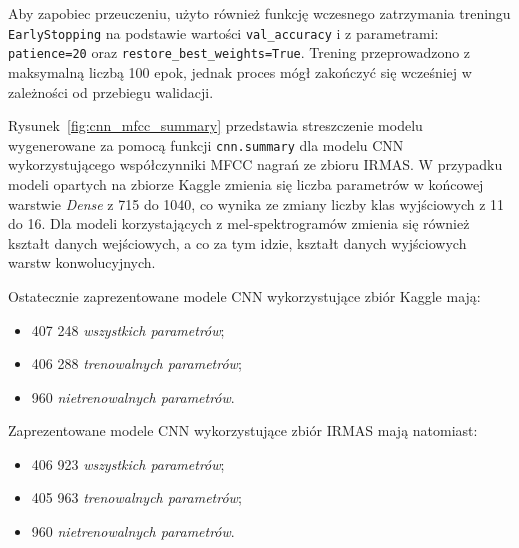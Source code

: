 \documentclass{SGGW-thesis}
\begin{document}
Aby zapobiec przeuczeniu, użyto również funkcję wczesnego zatrzymania treningu \texttt{EarlyStopping} na podstawie wartości \texttt{val\_accuracy} i z parametrami: \texttt{patience=20} oraz \texttt{restore\_best\_weights=True}. Trening przeprowadzono z maksymalną liczbą 100 epok, jednak proces mógł zakończyć się wcześniej w zależności od przebiegu walidacji.

Rysunek~\ref{fig:cnn_mfcc_summary} przedstawia streszczenie modelu wygenerowane za pomocą funkcji \texttt{cnn.summary} dla modelu CNN wykorzystującego współczynniki MFCC nagrań ze zbioru IRMAS. W przypadku modeli opartych na zbiorze Kaggle zmienia się liczba parametrów w końcowej warstwie \textit{Dense} z 715 do 1040, co wynika ze zmiany liczby klas wyjściowych z 11 do 16. Dla modeli korzystających z mel-spektrogramów zmienia się również kształt danych wejściowych, a co za tym idzie, kształt danych wyjściowych warstw konwolucyjnych. 

Ostatecznie zaprezentowane modele CNN wykorzystujące zbiór Kaggle mają:
\begin{itemize} 
    \item 407 248 \textit{wszystkich parametrów};
    \item 406 288 \textit{trenowalnych parametrów};
    \item 960 \textit{nietrenowalnych parametrów}.
 \end{itemize}

Zaprezentowane modele CNN wykorzystujące zbiór IRMAS mają natomiast:
\begin{itemize} 
    \item 406 923 \textit{wszystkich parametrów};
    \item 405 963 \textit{trenowalnych parametrów};
    \item 960 \textit{nietrenowalnych parametrów}.
 \end{itemize}
\end{document}
